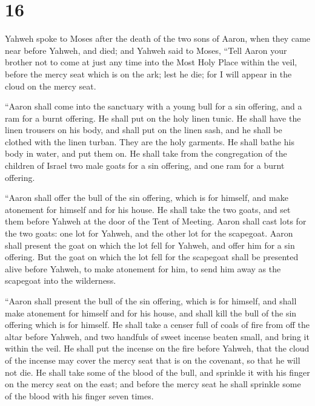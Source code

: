 \hypertarget{section-15}{%
\section{16}\label{section-15}}

 Yahweh spoke to Moses after the death of the two sons of
Aaron, when they came near before Yahweh, and died;  and
Yahweh said to Moses, ``Tell Aaron your brother not to come at just any
time into the Most Holy Place within the veil, before the mercy seat
which is on the ark; lest he die; for I will appear in the cloud on the
mercy seat.

 ``Aaron shall come into the sanctuary with a young bull for
a sin offering, and a ram for a burnt offering.  He shall
put on the holy linen tunic. He shall have the linen trousers on his
body, and shall put on the linen sash, and he shall be clothed with the
linen turban. They are the holy garments. He shall bathe his body in
water, and put them on.  He shall take from the congregation
of the children of Israel two male goats for a sin offering, and one ram
for a burnt offering.

 ``Aaron shall offer the bull of the sin offering, which is
for himself, and make atonement for himself and for his house.
 He shall take the two goats, and set them before Yahweh at
the door of the Tent of Meeting.  Aaron shall cast lots for
the two goats: one lot for Yahweh, and the other lot for the scapegoat.
 Aaron shall present the goat on which the lot fell for
Yahweh, and offer him for a sin offering.  But the goat on
which the lot fell for the scapegoat shall be presented alive before
Yahweh, to make atonement for him, to send him away as the scapegoat
into the wilderness.

 ``Aaron shall present the bull of the sin offering, which
is for himself, and shall make atonement for himself and for his house,
and shall kill the bull of the sin offering which is for himself.
 He shall take a censer full of coals of fire from off the
altar before Yahweh, and two handfuls of sweet incense beaten small, and
bring it within the veil.  He shall put the incense on the
fire before Yahweh, that the cloud of the incense may cover the mercy
seat that is on the covenant, so that he will not die.  He
shall take some of the blood of the bull, and sprinkle it with his
finger on the mercy seat on the east; and before the mercy seat he shall
sprinkle some of the blood with his finger seven times.

